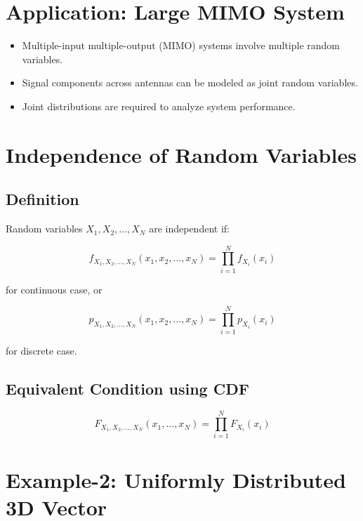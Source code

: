 \documentclass[11pt]{article}
\begin{document}
\section{Application: Large MIMO System}

\begin{itemize}
    \item Multiple-input multiple-output (MIMO) systems involve multiple random variables.
    \item Signal components across antennas can be modeled as joint random variables.
    \item Joint distributions are required to analyze system performance.
\end{itemize}

\section{Independence of Random Variables}

\subsection{Definition}

Random variables $X_1, X_2, \dots, X_N$ are independent if:

\[
f_{X_1, X_2, \dots, X_N}(x_1, x_2, \dots, x_N)
= \prod_{i=1}^{N} f_{X_i}(x_i)
\]

for continuous case, or

\[
p_{X_1, X_2, \dots, X_N}(x_1, x_2, \dots, x_N)
= \prod_{i=1}^{N} p_{X_i}(x_i)
\]

for discrete case.

\subsection{Equivalent Condition using CDF}

\[
F_{X_1, X_2, \dots, X_N}(x_1, \dots, x_N)
= \prod_{i=1}^{N} F_{X_i}(x_i)
\]

\section{Example-2: Uniformly Distributed 3D Vector}
\end{document}
